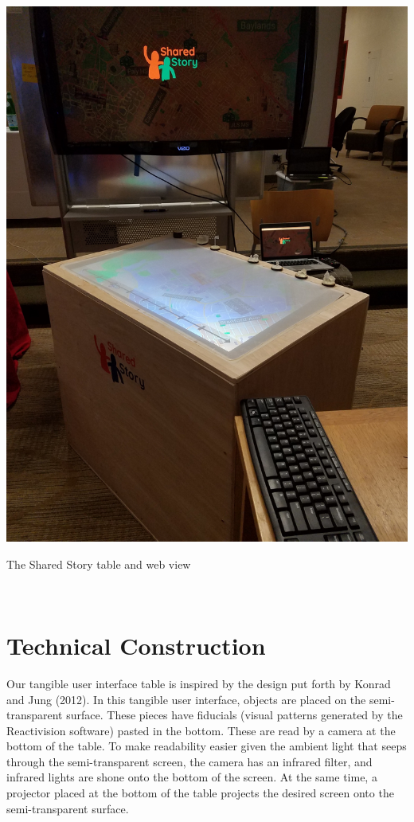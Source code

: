 \documentclass{sigchi-ext}
\begin{document}
\begin{marginfigure}[-14pc]
  \begin{minipage}{\marginparwidth}
    \centering
    \includegraphics[width=0.9\marginparwidth]{figures/table}
    \caption{The Shared Story table and web view}~\label{fig:table}
  \end{minipage}
\end{marginfigure}

\section{Technical Construction}

Our tangible user interface table is inspired by the design put forth by Konrad and Jung (2012). In this tangible user interface, objects are placed on the semi-transparent surface. These pieces have fiducials (visual patterns generated by the Reactivision software) pasted in the bottom. These are read by a camera at the bottom of the table. To make readability easier given the ambient light that seeps through the semi-transparent screen, the camera has an infrared filter, and infrared lights are shone onto the bottom of the screen. At the same time, a projector placed at the bottom of the table projects the desired screen onto the semi-transparent surface. 
\end{document}
